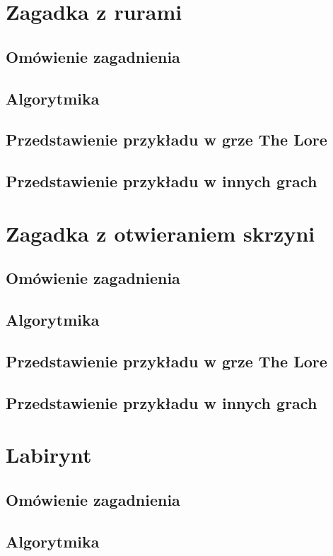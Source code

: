 \documentclass[oneside,polski,logo]{amuthesis}
\begin{document}
\section{Zagadka z rurami}
\subsection{Omówienie zagadnienia}
\subsection{Algorytmika}
\subsection{Przedstawienie przykładu w grze The Lore}
\subsection{Przedstawienie przykładu w innych grach}

\section{Zagadka z otwieraniem skrzyni}
\subsection{Omówienie zagadnienia}
\subsection{Algorytmika}
\subsection{Przedstawienie przykładu w grze The Lore}
\subsection{Przedstawienie przykładu w innych grach}

\section{Labirynt}
\subsection{Omówienie zagadnienia}
\subsection{Algorytmika}
\end{document}
